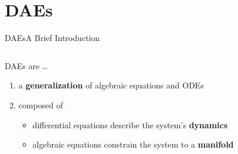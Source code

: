 
\section{\aclp{DAE}}

\begin{frame}{\aclp{DAE}}{A Brief Introduction}
  \begin{columns}
    \begin{column}{0.65\textwidth}
      \acsp{DAE} are \dots
      \begin{enumerate}[<+->]
        \item a \textbf{generalization} of algebraic equations and \acsp{ODE} \\
        \item composed of
        \begin{itemize}
          \item<2-> differential equations describe the system's \textbf{dynamics}
          \item<2-> algebraic equations constrain the system to a \textbf{manifold} \\
        \end{itemize}
      \end{enumerate}
    \end{column}
    \begin{column}{0.35\textwidth}
      \centering

\end{column}
\end{columns}
\end{frame}
